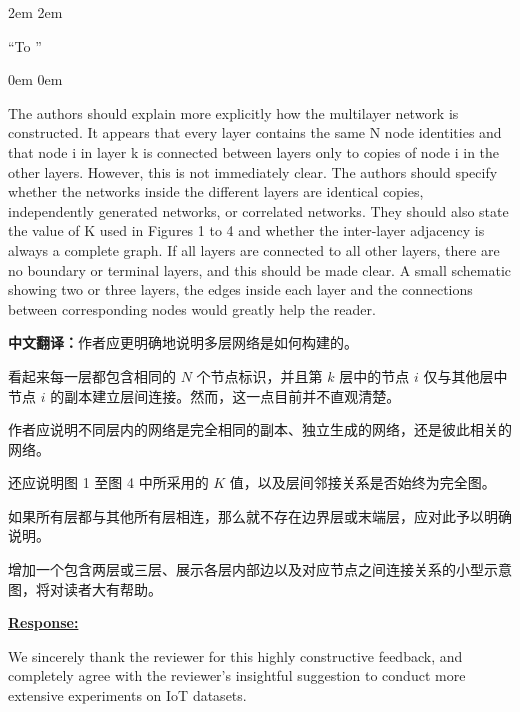 \documentclass[a4paper,12pt]{article}
\newcommand{\zhtranslationfirst}[1]{%
    \par\medskip\noindent
    {\small\color{blue!60!black}\textbf{中文翻译：}#1}\par
}
\newcommand{\zhtranslation}[1]{%
    \par\smallskip\noindent
    {\small\color{blue!60!black}#1}\par
}
\begin{document}
\leftskip 2em
\rightskip 2em
\medskip

``To ''

\leftskip 0em
\rightskip 0em
\medskip

\newpage
\begin{tcolorbox}[title = {Comment 1 Construction of the multilayer network},fonttitle = \bfseries]
    The authors should explain more explicitly how the multilayer network is constructed. It appears that every layer contains the same N node identities and that node i in layer k is connected between layers only to copies of node i in the other layers. However, this is not immediately clear. The authors should specify whether the networks inside the different layers are identical copies, independently generated networks, or correlated networks. They should also state the value of K used in Figures 1 to 4 and whether the inter-layer adjacency is always a complete graph. If all layers are connected to all other layers, there are no boundary or terminal layers, and this should be made clear. A small schematic showing two or three layers, the edges inside each layer and the connections between corresponding nodes would greatly help the reader.
    \zhtranslationfirst{作者应更明确地说明多层网络是如何构建的。}
    \zhtranslation{看起来每一层都包含相同的 $N$ 个节点标识，并且第 $k$ 层中的节点 $i$ 仅与其他层中节点 $i$ 的副本建立层间连接。然而，这一点目前并不直观清楚。}
    \zhtranslation{作者应说明不同层内的网络是完全相同的副本、独立生成的网络，还是彼此相关的网络。}
    \zhtranslation{还应说明图 1 至图 4 中所采用的 $K$ 值，以及层间邻接关系是否始终为完全图。}
    \zhtranslation{如果所有层都与其他所有层相连，那么就不存在边界层或末端层，应对此予以明确说明。}
    \zhtranslation{增加一个包含两层或三层、展示各层内部边以及对应节点之间连接关系的小型示意图，将对读者大有帮助。}
\end{tcolorbox}

\noindent \underline {\textbf{Response:}}
\bigskip

We sincerely thank the reviewer for this highly constructive feedback, and completely agree with the reviewer's insightful suggestion to conduct more extensive experiments on IoT datasets.
\end{document}
